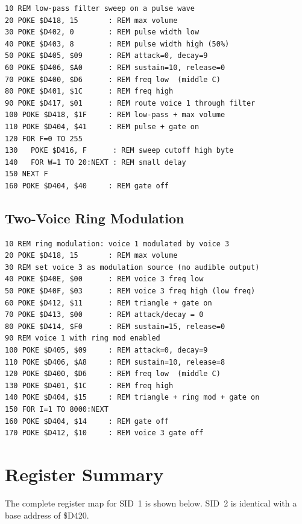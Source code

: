 \begin{lstlisting}
10 REM low-pass filter sweep on a pulse wave
20 POKE $D418, 15       : REM max volume
30 POKE $D402, 0        : REM pulse width low
40 POKE $D403, 8        : REM pulse width high (50%)
50 POKE $D405, $09      : REM attack=0, decay=9
60 POKE $D406, $A0      : REM sustain=10, release=0
70 POKE $D400, $D6      : REM freq low  (middle C)
80 POKE $D401, $1C      : REM freq high
90 POKE $D417, $01      : REM route voice 1 through filter
100 POKE $D418, $1F     : REM low-pass + max volume
110 POKE $D404, $41     : REM pulse + gate on
120 FOR F=0 TO 255
130   POKE $D416, F      : REM sweep cutoff high byte
140   FOR W=1 TO 20:NEXT : REM small delay
150 NEXT F
160 POKE $D404, $40     : REM gate off
\end{lstlisting}

\subsection*{Two-Voice Ring Modulation}

\begin{lstlisting}
10 REM ring modulation: voice 1 modulated by voice 3
20 POKE $D418, 15       : REM max volume
30 REM set voice 3 as modulation source (no audible output)
40 POKE $D40E, $00      : REM voice 3 freq low
50 POKE $D40F, $03      : REM voice 3 freq high (low freq)
60 POKE $D412, $11      : REM triangle + gate on
70 POKE $D413, $00      : REM attack/decay = 0
80 POKE $D414, $F0      : REM sustain=15, release=0
90 REM voice 1 with ring mod enabled
100 POKE $D405, $09     : REM attack=0, decay=9
110 POKE $D406, $A8     : REM sustain=10, release=8
120 POKE $D400, $D6     : REM freq low  (middle C)
130 POKE $D401, $1C     : REM freq high
140 POKE $D404, $15     : REM triangle + ring mod + gate on
150 FOR I=1 TO 8000:NEXT
160 POKE $D404, $14     : REM gate off
170 POKE $D412, $10     : REM voice 3 gate off
\end{lstlisting}


\section{Register Summary}
\label{sec:sid-summary}

The complete register map for SID~1 is shown below.  SID~2 is identical with
a base address of \$D420.

